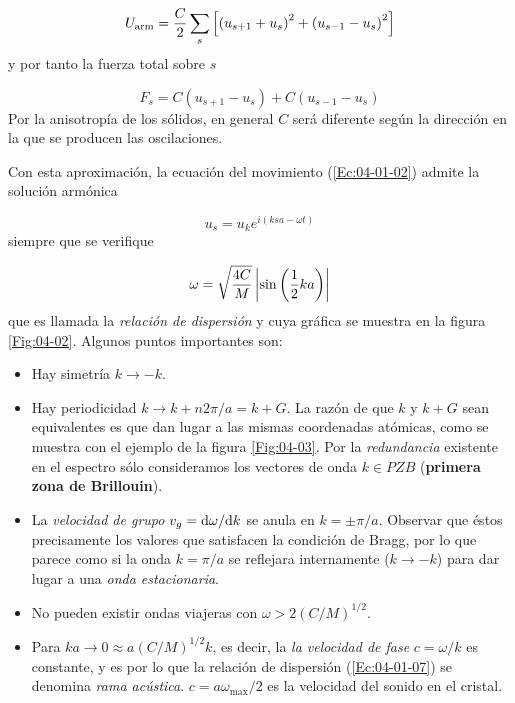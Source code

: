 \begin{equation}
	U_{\text{arm}} = \frac{C}{2} \sum_s \left[ \left( u_{s+1}+u_s \right)^2+\left( u_{s-1}-u_s \right)^2 \right]
\end{equation}
y por tanto la fuerza total sobre $s$ 

\begin{equation}
	F_s = C (u_{s+1}-u_s) + C(u_{s-1}-u_s)
\end{equation}
Por la anisotropía de los sólidos, en general $C$ será diferente según la dirección en la que se producen las oscilaciones. 

Con esta aproximación, la ecuación del movimiento (\ref{Ec:04-01-02}) admite la solución armónica

\begin{equation}
	u_s = u_k e^{i(ksa-\omega t)}
\end{equation}
siempre que se verifique 

\begin{equation}
	\omega = \sqrt{\frac{4C}{M}} \left| \sin \left( \frac{1}{2} k a \right) \right| \label{Ec:04-01-07}
\end{equation}
que es llamada la \textit{relación de dispersión} y cuya gráfica se muestra en la figura \ref{Fig:04-02}. Algunos puntos importantes son:

\begin{itemize}
	\item Hay simetría $k\rightarrow -k$.
	\item Hay periodicidad $k\rightarrow k+n2\pi/a=k+G$. La razón de que $k$ y $k+G$ sean equivalentes es que dan lugar a las mismas coordenadas atómicas, como se muestra con el ejemplo de la figura \ref{Fig:04-03}. Por la \textit{redundancia} existente en el espectro sólo consideramos los vectores de onda $k \in PZB$ (\textbf{primera zona de Brillouin}).
	\item La \textit{velocidad de grupo} $v_g = \mathrm{d}\omega / \mathrm{d} k$ se anula en $k=\pm \pi/a$. Observar que éstos precisamente los valores que satisfacen la condición de Bragg, por lo que parece como si la onda $k=\pi / a$ se reflejara internamente ($k \rightarrow -k$) para dar lugar a una \textit{onda estacionaria}.
	\item No pueden existir ondas viajeras con $\omega>2 (C/M)^{1/2}$.
	\item Para $ka\rightarrow 0 \approx a(C/M)^{1/2}k$, es decir, la \textit{la velocidad de fase} $c=\omega /k$ es constante, y es por lo que la relación de dispersión (\ref{Ec:04-01-07}) se denomina \textit{rama acústica}. $c=a \omega_{\max} /2$ es la velocidad del sonido en el cristal.
\end{itemize}


